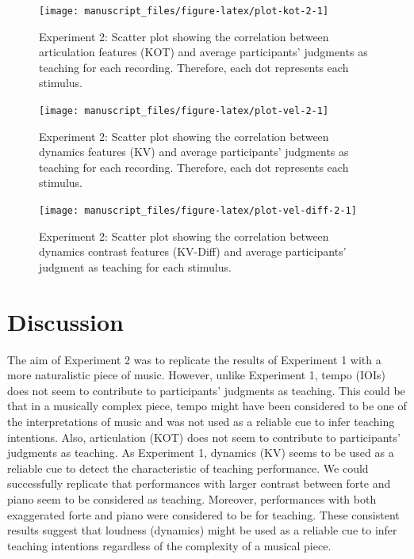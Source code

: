\documentclass[
  man,floatsintext]{apa6}
\begin{document}
\begin{figure}

{\centering \texttt{[image: manuscript\_files/figure-latex/plot-kot-2-1]} 

}

\caption{\label{fig:kot-2}Experiment 2: Scatter plot showing the correlation between articulation features (KOT) and average participants' judgments as teaching for each recording. Therefore, each dot represents each stimulus.}\label{fig:plot-kot-2}
\end{figure}

\begin{figure}

{\centering \texttt{[image: manuscript\_files/figure-latex/plot-vel-2-1]} 

}

\caption{\label{fig:vel-2}Experiment 2: Scatter plot showing the correlation between dynamics features (KV) and average participants' judgments as teaching for each recording. Therefore, each dot represents each stimulus.}\label{fig:plot-vel-2}
\end{figure}

\begin{figure}

{\centering \texttt{[image: manuscript\_files/figure-latex/plot-vel-diff-2-1]} 

}

\caption{\label{fig:vel-diff-2}Experiment 2: Scatter plot showing the correlation between dynamics contrast features (KV-Diff) and average participants' judgment as teaching for each stimulus.}\label{fig:plot-vel-diff-2}
\end{figure}

\hypertarget{discussion-1}{%
\section{Discussion}\label{discussion-1}}

The aim of Experiment 2 was to replicate the results of Experiment 1 with a more naturalistic piece of music. However, unlike Experiment 1, tempo (IOIs) does not seem to contribute to participants' judgments as teaching. This could be that in a musically complex piece, tempo might have been considered to be one of the interpretations of music and was not used as a reliable cue to infer teaching intentions. Also, articulation (KOT) does not seem to contribute to participants' judgments as teaching. As Experiment 1, dynamics (KV) seems to be used as a reliable cue to detect the characteristic of teaching performance. We could successfully replicate that performances with larger contrast between forte and piano seem to be considered as teaching. Moreover, performances with both exaggerated forte and piano were considered to be for teaching. These consistent results suggest that loudness (dynamics) might be used as a reliable cue to infer teaching intentions regardless of the complexity of a musical piece.
\end{document}
